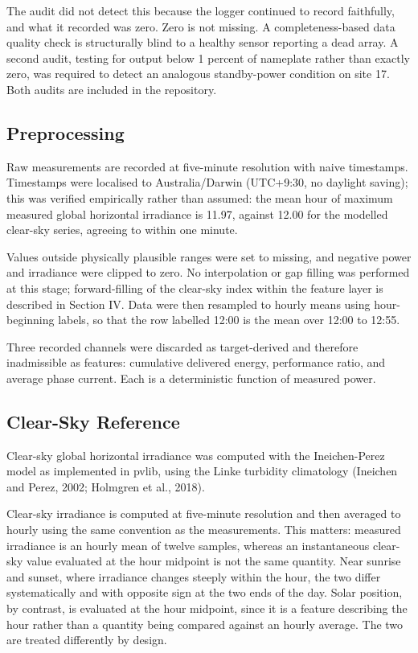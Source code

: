 The audit did not detect this because the logger continued to record
faithfully, and what it recorded was zero. Zero is not missing. A
completeness-based data quality check is structurally blind to a healthy
sensor reporting a dead array. A second audit, testing for output below
1 percent of nameplate rather than exactly zero, was required to detect
an analogous standby-power condition on site 17. Both audits are
included in the repository.

\subsection{Preprocessing}

Raw measurements are recorded at five-minute resolution with naive
timestamps. Timestamps were localised to Australia/Darwin (UTC+9:30, no
daylight saving); this was verified empirically rather than assumed: the
mean hour of maximum measured global horizontal irradiance is 11.97,
against 12.00 for the modelled clear-sky series, agreeing to within one
minute.

Values outside physically plausible ranges were set to missing, and
negative power and irradiance were clipped to zero. No interpolation or
gap filling was performed at this stage; forward-filling of the
clear-sky index within the feature layer is described in Section IV.
Data were then resampled to hourly means
using hour-beginning labels, so that the row labelled 12:00 is the mean
over 12:00 to 12:55.

Three recorded channels were discarded as target-derived and therefore
inadmissible as features: cumulative delivered energy, performance
ratio, and average phase current. Each is a deterministic function of
measured power.

\subsection{Clear-Sky Reference}

Clear-sky global horizontal irradiance was computed with the
Ineichen-Perez model as implemented in pvlib, using the Linke turbidity
climatology (Ineichen and Perez, 2002; Holmgren et al., 2018).

Clear-sky irradiance is computed at five-minute resolution and then
averaged to hourly using the same convention as the measurements. This
matters: measured irradiance is an hourly mean of twelve samples,
whereas an instantaneous clear-sky value evaluated at the hour midpoint
is not the same quantity. Near sunrise and sunset, where irradiance
changes steeply within the hour, the two differ systematically and with
opposite sign at the two ends of the day. Solar position, by contrast,
is evaluated at the hour midpoint, since it is a feature describing the
hour rather than a quantity being compared against an hourly average.
The two are treated differently by design.

